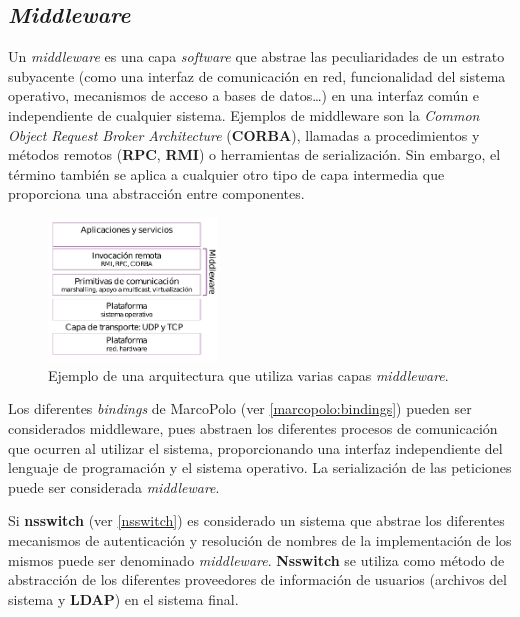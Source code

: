 
\subsection{\textit{Middleware}}
\label{teoria:middleware}

Un \textit{middleware} es una capa \textit{software} que abstrae las peculiaridades de un estrato subyacente (como una interfaz de comunicación en red, funcionalidad del sistema operativo, mecanismos de acceso a bases de datos\dots) en una interfaz común e independiente de cualquier sistema. Ejemplos de middleware son la \textit{Common Object Request Broker Architecture} (\textbf{CORBA}), llamadas a procedimientos y métodos remotos (\textbf{RPC}, \textbf{RMI}) o herramientas de serialización. Sin embargo, el término también se aplica a cualquier otro tipo de capa intermedia que proporciona una abstracción entre componentes.

\begin{figure}[H]
\centering
\includegraphics[width=0.4\textwidth]{Chapter2/Figures/middleware-rodrigo}
\caption{Ejemplo de una arquitectura que utiliza varias capas \textit{middleware}.}
\label{fig:middleware-rodrigo}
\end{figure}


Los diferentes \textit{bindings} de MarcoPolo (ver \ref{marcopolo:bindings}) pueden ser considerados middleware, pues abstraen los diferentes procesos de comunicación que ocurren al utilizar el sistema, proporcionando una interfaz independiente del lenguaje de programación y el sistema operativo. La serialización de las peticiones puede ser considerada \textit{middleware}.

Si \textbf{nsswitch} (ver \ref{nsswitch}) es considerado un sistema que abstrae los diferentes mecanismos de autenticación y resolución de nombres de la implementación de los mismos puede ser denominado \textit{middleware}. \textbf{Nsswitch} se utiliza como método de abstracción de los diferentes proveedores de información de usuarios (archivos del sistema y \textbf{LDAP}) en el sistema final.

